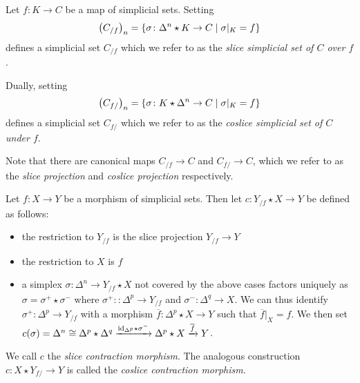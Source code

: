 \begin{definition}[(Co)Slice] %
    Let $f\colon K\to C$ be a map of simplicial sets.
    Setting 
    \begin{equation*}
        \left(C_{/f}\right)_n=\left\lbrace\sigma\colon \Delta^n\star K\to C \mid \sigma|_K=f\right\rbrace
    \end{equation*}
    defines a simplicial set $C_{/f}$ which we refer to as the \emph{slice simplicial set of $C$ over $f$}.

    Dually, setting 
    \begin{equation*}
        \left(C_{f/}\right)_n=\left\lbrace\sigma\colon K\star \Delta^n \to C \mid \sigma|_K=f\right\rbrace
    \end{equation*}
    defines a simplicial set $C_{f/}$ which we refer to as the \emph{coslice simplicial set of $C$ under $f$}.

    Note that there are canonical maps $C_{/f}\to C$ and $C_{f/}\to C$, which we refer to as the \emph{slice projection} and \emph{coslice projection} respectively.
\end{definition}
\begin{construction}
    Let $f\colon X\to Y$ be a morphism of simplicial sets.
    Then let $c\colon Y_{/f}\star X\to Y$ be defined as follows:
    \begin{itemize}
        \item the restriction to $Y_{/f}$ is the slice projection $Y_{/f}\to Y$
        \item the restriction to $X$ is $f$
        \item a simplex $\sigma\colon\Delta^n\to Y_{/f}\star X$ not covered by the above cases factors uniquely as $\sigma=\sigma^+\star\sigma^-$ where $\sigma^+\colon\colon\Delta^p\to Y_{/f}$ and $\sigma^-\colon\Delta^q\to X$.
              We can thus identify $\sigma^+\colon\Delta^p\to Y_{/f}$ with a morphism $\overline{f}\colon\Delta^p\star X\to Y$ such that $\overline{f}|_{X}=f$.
              We then set $c(\sigma)=\Delta^n\cong\Delta^p\star\Delta^q\xrightarrow{\text{id}_{\Delta^p}\star\sigma^-}\Delta^p\star X\xrightarrow{\overline{f}} Y$.
    \end{itemize}
    We call $c$ the \emph{slice contraction morphism}.
    The analogous construction $c\colon X\star Y_{f/}\to Y$ is called the \emph{coslice contraction morphism}.
    \begin{reference}
        \cite[Construction 4.3.5.12]{kerodon}
    \end{reference}
\end{construction}
